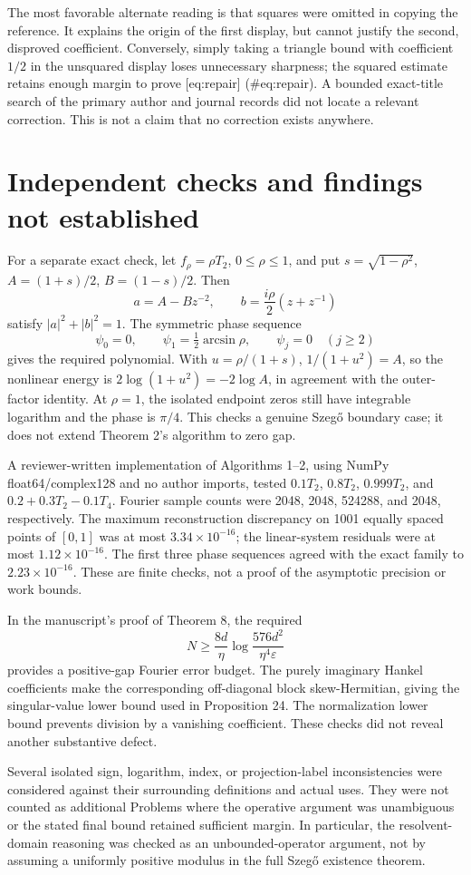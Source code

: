 \documentclass[10pt]{article}
\begin{document}
The most favorable alternate reading is that squares were omitted in copying the reference. It explains the origin of the first display, but cannot justify the second, disproved coefficient. Conversely, simply taking a triangle bound with coefficient \(1/2\) in the unsquared display loses unnecessary sharpness; the squared estimate retains enough margin to prove [eq:repair] (\#eq:repair). A bounded exact-title search of the primary author and journal records did not locate a relevant correction. This is not a claim that no correction exists anywhere.\par
\section*{Independent checks and findings not established}
For a separate exact check, let \(f_\rho=\rho T_2\), \(0\leq\rho\leq1\), and put \(s=\sqrt{1-\rho^2}\), \(A=(1+s)/2\), \(B=(1-s)/2\). Then \[a=A-Bz^{-2},\qquad b=\frac{i\rho}{2}(z+z^{-1})\] satisfy \(|a|^2+|b|^2=1\). The symmetric phase sequence \[\psi_0=0,\qquad \psi_1=\tfrac12\arcsin\rho,\qquad
 \psi_j=0\quad(j\geq2)\] gives the required polynomial. With \(u=\rho/(1+s)\), \(1/(1+u^2)=A\), so the nonlinear energy is \(2\log(1+u^2)=-2\log A\), in agreement with the outer-factor identity. At \(\rho=1\), the isolated endpoint zeros still have integrable logarithm and the phase is \(\pi/4\). This checks a genuine Szegő boundary case; it does not extend Theorem 2’s algorithm to zero gap.\par
A reviewer-written implementation of Algorithms 1–2, using NumPy float64/complex128 and no author imports, tested \(0.1T_2\), \(0.8T_2\), \(0.999T_2\), and \(0.2+0.3T_2-0.1T_4\). Fourier sample counts were 2048, 2048, 524288, and 2048, respectively. The maximum reconstruction discrepancy on 1001 equally spaced points of \([0,1]\) was at most \(3.34\times10^{-16}\); the linear-system residuals were at most \(1.12\times10^{-16}\). The first three phase sequences agreed with the exact family to \(2.23\times10^{-16}\). These are finite checks, not a proof of the asymptotic precision or work bounds.\par
In the manuscript’s proof of Theorem 8, the required \[N\geq\frac{8d}{\eta}\log\frac{576d^2}{\eta^4\varepsilon}\] provides a positive-gap Fourier error budget. The purely imaginary Hankel coefficients make the corresponding off-diagonal block skew-Hermitian, giving the singular-value lower bound used in Proposition 24. The normalization lower bound prevents division by a vanishing coefficient. These checks did not reveal another substantive defect.\par
Several isolated sign, logarithm, index, or projection-label inconsistencies were considered against their surrounding definitions and actual uses. They were not counted as additional Problems where the operative argument was unambiguous or the stated final bound retained sufficient margin. In particular, the resolvent-domain reasoning was checked as an unbounded-operator argument, not by assuming a uniformly positive modulus in the full Szegő existence theorem.\par
\end{document}
